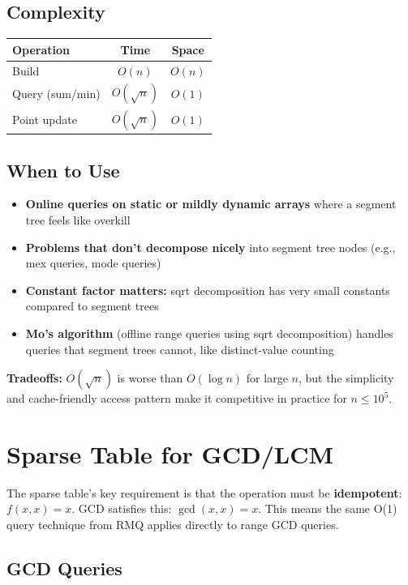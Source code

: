 \subsection{Complexity}

\begin{center}
\begin{tabular}{lcc}
\toprule
Operation & Time & Space \\
\midrule
Build & $O(n)$ & $O(n)$ \\
Query (sum/min) & $O(\sqrt{n})$ & $O(1)$ \\
Point update & $O(\sqrt{n})$ & $O(1)$ \\
\bottomrule
\end{tabular}
\end{center}

\subsection{When to Use}

\begin{itemize}
\item \textbf{Online queries on static or mildly dynamic arrays} where a segment tree feels like overkill
\item \textbf{Problems that don't decompose nicely} into segment tree nodes (e.g., mex queries, mode queries)
\item \textbf{Constant factor matters:} sqrt decomposition has very small constants compared to segment trees
\item \textbf{Mo's algorithm} (offline range queries using sqrt decomposition) handles queries that segment trees cannot, like distinct-value counting
\end{itemize}

\textbf{Tradeoffs:} $O(\sqrt{n})$ is worse than $O(\log n)$ for large $n$, but the simplicity and cache-friendly access pattern make it competitive in practice for $n \le 10^{5}$.

\section{Sparse Table for GCD/LCM}

The sparse table's key requirement is that the operation must be \textbf{idempotent}: $f(x, x) = x$. GCD satisfies this: $\gcd(x, x) = x$. This means the same O(1) query technique from RMQ applies directly to range GCD queries.

\subsection{GCD Queries}

